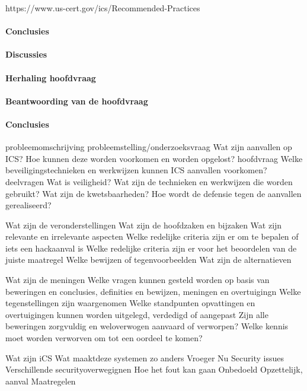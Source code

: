 		
		
		
		
		https://www.us-cert.gov/ics/Recommended-Practices
		\paragraph{Conclusies}
		
		
		\paragraph{Discussies}
		
		\paragraph{Herhaling hoofdvraag}
		
		\paragraph{Beantwoording van de hoofdvraag}
		
		\paragraph{Conclusies}
		probleemomschrijving
		probleemstelling/onderzoeksvraag Wat zijn aanvallen op ICS? Hoe kunnen deze worden voorkomen
		en worden opgelost?
		hoofdvraag
		Welke beveiligingstechnieken en werkwijzen kunnen ICS aanvallen voorkomen?
		deelvragen
		Wat is veiligheid?
		Wat zijn de technieken en werkwijzen die worden gebruikt?
		Wat zijn de kwetsbaarheden?
		Hoe wordt de defensie tegen de aanvallen gerealiseerd?
		
		Wat zijn de veronderstellingen
		Wat zijn de hoofdzaken en bijzaken
		Wat zijn relevante en irrelevante aspecten
		Welke redelijke criteria zijn er om te bepalen of iets een hackaanval is
		Welke redelijke criteria zijn er voor het beoordelen van de juiste maatregel
		Welke bewijzen of tegenvoorbeelden
		Wat zijn de alternatieven
		
		Wat zijn de meningen
		Welke vragen kunnen gesteld worden op basis van beweringen en conclusies, definities en bewijzen,
		meningen en overtuigingn
		Welke tegenstellingen zijn waargenomen
		Welke standpunten opvattingen en overtuigingen kunnen worden uitgelegd, verdedigd of aangepast
		Zijn alle beweringen zorgvuldig en weloverwogen aanvaard of verworpen?
		Welke kennis moet worden verworven om tot een oordeel te komen?
		
		Wat zijn iCS
		Wat maaktdeze systemen zo anders
		Vroeger
		Nu
		Security issues
		Verschillende securityoverwegignen
		Hoe het fout kan gaan
		Onbedoeld
		Opzettelijk, aanval
		Maatregelen
		
